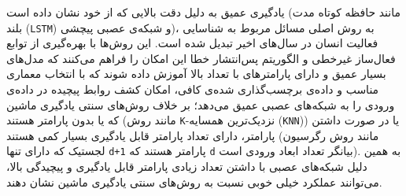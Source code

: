 یادگیری عمیق
به دلیل دقت بالایی که از خود نشان داده است\cite{chen2021deep}
(مانند حافظه کوتاه مدت بلند (\verb;LSTM;) و شبکه‌ی عصبی پیچشی)،
به روش اصلی مسائل مربوط به شناسایی فعالیت انسان در سال‌های اخیر تبدیل شده است. این روش‌ها با بهره‌گیری از
توابع فعال‌ساز غیرخطی
و الگوریتم پس‌انتشار خطا\cite{rumelhart1986learning}
این امکان را فراهم می‌کنند که مدل‌های بسیار عمیق و دارای پارامترهای با تعداد بالا آموزش داده شوند که با انتخاب معماری مناسب و داده‌ی برچسب‌گذاری شده‌ی کافی، امکان کشف روابط پیچیده در داده‌ی ورودی را به شبکه‌های عصبی عمیق می‌دهد؛ بر خلاف روش‌های سنتی یادگیری ماشین که یا بدون پارامتر هستند (مانند روش \verb;K;-نزدیک‌ترین همسایه (\verb;KNN;))
یا در صورت داشتن پارامتر، دارای تعداد پارامتر قابل یادگیری بسیار کمی هستند
(مانند روش رگرسیون لجستیک که دارای تنها \verb|d+1| پارامتر هستند که \verb|d| بیانگر تعداد ابعاد ورودی است).
به همین دلیل شبکه‌های عصبی با داشتن تعداد زیادی پارامتر قابل یادگیری و پیچیدگی بالا، می‌توانند عملکرد خیلی خوبی نسبت به روش‌های سنتی یادگیری ماشین نشان دهند.

